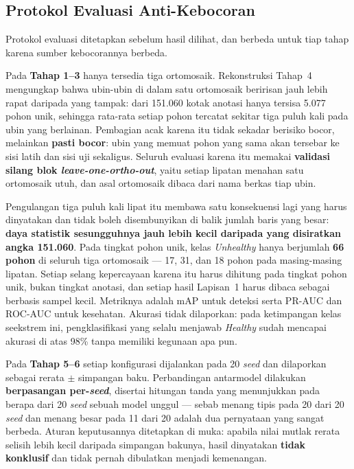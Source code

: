 \subsection{Protokol Evaluasi Anti-Kebocoran}

Protokol evaluasi ditetapkan sebelum hasil dilihat, dan berbeda untuk tiap tahap karena
sumber kebocorannya berbeda.

Pada \textbf{Tahap 1--3} hanya tersedia tiga ortomosaik. Rekonstruksi Tahap~4 mengungkap
bahwa ubin-ubin di dalam satu ortomosaik beririsan jauh lebih rapat daripada yang tampak:
dari 151.060 kotak anotasi hanya tersisa 5.077 pohon unik, sehingga rata-rata setiap pohon
tercatat sekitar tiga puluh kali pada ubin yang berlainan. Pembagian acak karena itu tidak
sekadar berisiko bocor, melainkan \textbf{pasti bocor}: ubin yang memuat pohon yang sama
akan tersebar ke sisi latih dan sisi uji sekaligus. Seluruh evaluasi karena itu memakai
\textbf{validasi silang blok \textit{leave-one-ortho-out}}, yaitu setiap lipatan menahan
satu ortomosaik utuh, dan asal ortomosaik dibaca dari nama berkas tiap ubin.

Pengulangan tiga puluh kali lipat itu membawa satu konsekuensi lagi yang harus dinyatakan
dan tidak boleh disembunyikan di balik jumlah baris yang besar: \textbf{daya statistik
sesungguhnya jauh lebih kecil daripada yang disiratkan angka 151.060}. Pada tingkat pohon
unik, kelas \textit{Unhealthy} hanya berjumlah \textbf{66 pohon} di seluruh tiga ortomosaik
--- 17, 31, dan 18 pohon pada masing-masing lipatan. Setiap selang kepercayaan karena itu
harus dihitung pada tingkat pohon unik, bukan tingkat anotasi, dan setiap hasil Lapisan~1
harus dibaca sebagai berbasis sampel kecil. Metriknya
adalah mAP untuk deteksi serta PR-AUC dan ROC-AUC untuk kesehatan. Akurasi tidak
dilaporkan: pada ketimpangan kelas seekstrem ini, pengklasifikasi yang selalu menjawab
\textit{Healthy} sudah mencapai akurasi di atas 98\% tanpa memiliki kegunaan apa pun.

Pada \textbf{Tahap 5--6} setiap konfigurasi dijalankan pada 20 \textit{seed} dan
dilaporkan sebagai rerata $\pm$ simpangan baku. Perbandingan antarmodel dilakukan
\textbf{berpasangan per-\textit{seed}}, disertai hitungan tanda yang menunjukkan pada
berapa dari 20 \textit{seed} sebuah model unggul --- sebab menang tipis pada 20 dari 20
\textit{seed} dan menang besar pada 11 dari 20 adalah dua pernyataan yang sangat berbeda.
Aturan keputusannya ditetapkan di muka: apabila nilai mutlak rerata selisih lebih kecil
daripada simpangan bakunya, hasil dinyatakan \textbf{tidak konklusif} dan tidak pernah
dibulatkan menjadi kemenangan.

